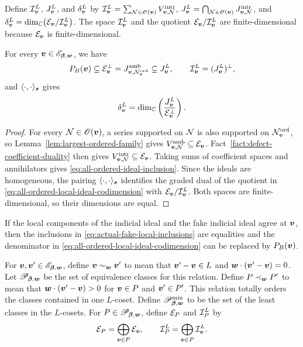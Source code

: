 Define \(\mathcal I_{\boldsymbol{v}}^{L}\), \(J_{\boldsymbol{v}}^{L}\), and \(\delta_{\boldsymbol{v}}^{L}\) by \(\mathcal I_{\boldsymbol{v}}^{L}=\sum_{\mathcal N\in\mathscr O(\boldsymbol{v})}V_{\boldsymbol{v},\mathcal N}^{\mathrm{intr}}\), \(J_{\boldsymbol{v}}^{L}=\bigcap_{\mathcal N\in\mathscr O(\boldsymbol{v})}J_{\boldsymbol{v},\mathcal N}^{\mathrm{intr}}\), and \(\delta_{\boldsymbol{v}}^{L}=\dim_{\mathbb C}\bigl(\mathcal E_{\boldsymbol{v}}/\mathcal I_{\boldsymbol{v}}^{L}\bigr)\).
The space \(\mathcal I_{\boldsymbol{v}}^{L}\) and the quotient \(\mathcal E_{\boldsymbol{v}}/\mathcal I_{\boldsymbol{v}}^{L}\) are finite-dimensional because \(\mathcal E_{\boldsymbol{v}}\) is finite-dimensional.

\begin{proposition}
	\label{prop:all-ordered-local-quotient}
	For every \(\boldsymbol{v}\in\mathscr E_{\boldsymbol{\beta},\boldsymbol{w}}\), we have
	\begin{equation}
		P_B(\boldsymbol{v})
		\subseteq
		\mathcal E_{\boldsymbol{v}}^{\perp}
		=
		J_{\boldsymbol{v},\mathcal N_{\boldsymbol{v}}^{\mathrm{ord}}}^{\mathrm{amb}}
		\subseteq
		J_{\boldsymbol{v}}^{L},
		\qquad
		\mathcal I_{\boldsymbol{v}}^{L}
		=
		(J_{\boldsymbol{v}}^{L})^\perp,
		\label{eq:all-ordered-ideal-inclusion}
	\end{equation}
	and \(\langle\cdot,\cdot\rangle_{\boldsymbol{s}}\) gives
	\begin{equation}
		\delta_{\boldsymbol{v}}^{L}
		=
		\dim_{\mathbb C}
		\left(
		\frac{J_{\boldsymbol{v}}^{L}}
		{\mathcal E_{\boldsymbol{v}}^{\perp}}
		\right).
		\label{eq:all-ordered-local-ideal-codimension}
	\end{equation}
\end{proposition}

\begin{proof}
	For every \(\mathcal N\in\mathscr O(\boldsymbol{v})\), a series supported on \(\mathcal N\) is also supported on \(\mathcal N_{\boldsymbol{v}}^{\mathrm{ord}}\), so Lemma~\ref{lem:largest-ordered-family} gives \(V_{\boldsymbol{v},\mathcal N}^{\mathrm{amb}}\subseteq\mathcal E_{\boldsymbol{v}}\).
	Fact~\ref{fact:defect-coefficient-duality} then gives \(V_{\boldsymbol{v},\mathcal N}^{\mathrm{intr}}\subseteq\mathcal E_{\boldsymbol{v}}\).
	Taking sums of coefficient spaces and annihilators gives \eqref{eq:all-ordered-ideal-inclusion}.
	Since the ideals are homogeneous, the pairing \(\langle\cdot,\cdot\rangle_{\boldsymbol{s}}\) identifies the graded dual of the quotient in \eqref{eq:all-ordered-local-ideal-codimension} with \(\mathcal E_{\boldsymbol{v}}/\mathcal I_{\boldsymbol{v}}^{L}\).
	Both spaces are finite-dimensional, so their dimensions are equal.
\end{proof}

\begin{remark}
	If the local components of the indicial ideal and the fake indicial ideal agree at \(\boldsymbol{v}\), then the inclusions in \eqref{eq:actual-fake-local-inclusions} are equalities and the denominator in \eqref{eq:all-ordered-local-ideal-codimension} can be replaced by \(P_B(\boldsymbol{v})\).
\end{remark}

For \(\boldsymbol{v},\boldsymbol{v}'\in\mathscr E_{\boldsymbol{\beta},\boldsymbol{w}}\), define \(\boldsymbol{v}\sim_{\boldsymbol{w}}\boldsymbol{v}'\) to mean that \(\boldsymbol{v}'-\boldsymbol{v}\in L\) and \(\boldsymbol{w}\cdot(\boldsymbol{v}'-\boldsymbol{v})=0\).
Let \(\mathscr P_{\boldsymbol{\beta},\boldsymbol{w}}\) be the set of equivalence classes for this relation.
Define \(P\prec_{\boldsymbol{w}}P'\) to mean that \(\boldsymbol{w}\cdot(\boldsymbol{v}'-\boldsymbol{v})>0\) for \(\boldsymbol{v}\in P\) and \(\boldsymbol{v}'\in P'\).
This relation totally orders the classes contained in one \(L\)-coset.
Define \(\mathscr P_{\boldsymbol{\beta},\boldsymbol{w}}^{\min}\) to be the set of the least classes in the \(L\)-cosets.
For \(P\in\mathscr P_{\boldsymbol{\beta},\boldsymbol{w}}\), define \(\mathcal E_P\) and \(\mathcal I_P^{L}\) by
\begin{equation}
	\mathcal E_P
	=
	\bigoplus_{\boldsymbol{v}\in P}\mathcal E_{\boldsymbol{v}},
	\qquad
	\mathcal I_P^{L}
	=
	\bigoplus_{\boldsymbol{v}\in P}\mathcal I_{\boldsymbol{v}}^{L}.
	\label{eq:formal-weight-class-local-spaces}
\end{equation}

